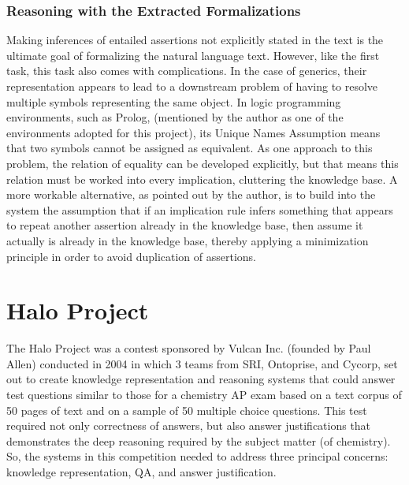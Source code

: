 \subsubsection{Reasoning with the Extracted Formalizations}

Making inferences of entailed assertions not explicitly stated in the text is the ultimate goal of formalizing the natural language text.  However, like the first task, this task also comes with complications.  In the case of generics, their representation appears to lead to a downstream problem of having to resolve multiple symbols representing the same object.  In logic programming environments, such as Prolog, \cite{blackburn_2006_prolog_ch1,blackburn_2006_prolog_ch2,blackburn_2006_prolog_ch3,blackburn_2006_prolog_ch4,blackburn_2006_prolog_ch5,blackburn_2006_prolog_ch6} (mentioned by the author as one of the environments adopted for this project), its Unique Names Assumption means that two symbols cannot be assigned as equivalent.  As one approach to this problem, the relation of equality can be developed explicitly, but that means this relation must be worked into every implication, cluttering the knowledge base.  A more workable alternative, as pointed out by the author, is to build into the system the assumption that if an implication rule infers something that appears to repeat another assertion already in the knowledge base, then assume it actually is already in the knowledge base, thereby applying a minimization principle in order to avoid duplication of assertions.


\section{Halo Project}

The Halo Project \cite{friedland2004project} was a contest sponsored by Vulcan Inc. (founded by Paul Allen) conducted in 2004 in which 3 teams from SRI, Ontoprise, and Cycorp, set out to create knowledge representation and reasoning systems that could answer test questions similar to those for a chemistry AP exam based on a text corpus of 50 pages of text and on a sample of 50 multiple choice questions.  This test required not only correctness of answers, but also answer justifications that demonstrates the deep reasoning required by the subject matter (of chemistry).  So, the systems in this competition needed to address three principal concerns:  knowledge representation, QA, and answer justification. 

